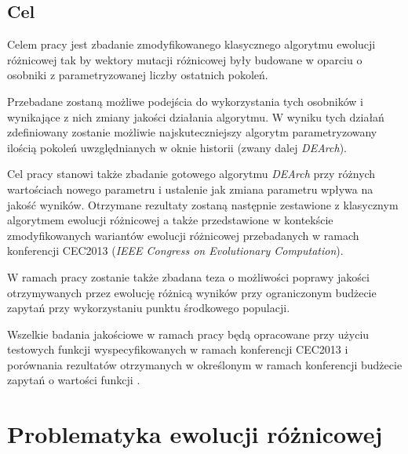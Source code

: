 \documentclass[12pt,a4paper]{report}
\begin{document}
{\section{Cel}
\par{
Celem pracy jest zbadanie zmodyfikowanego klasycznego algorytmu ewolucji różnicowej tak by wektory mutacji różnicowej były budowane w oparciu o osobniki z parametryzowanej liczby ostatnich pokoleń.
}
\par{
Przebadane zostaną możliwe podejścia do wykorzystania tych osobników i wynikające z nich zmiany jakości działania algorytmu. W wyniku tych działań zdefiniowany zostanie możliwie najskuteczniejszy algorytm parametryzowany ilością pokoleń uwzględnianych w oknie historii (zwany dalej \emph{DEArch}).
}
\par{
Cel pracy stanowi także zbadanie gotowego algorytmu \emph{DEArch} przy różnych wartościach nowego parametru i ustalenie jak zmiana parametru wpływa na jakość wyników. Otrzymane rezultaty zostaną następnie zestawione z klasycznym algorytmem ewolucji różnicowej a także przedstawione w kontekście zmodyfikowanych wariantów ewolucji różnicowej przebadanych w ramach konferencji CEC2013 (\emph{IEEE Congress on Evolutionary Computation}).
}
\par{
W ramach pracy zostanie także zbadana teza o możliwości poprawy jakości otrzymywanych przez ewolucję różnicą wyników przy ograniczonym budżecie zapytań przy wykorzystaniu punktu środkowego populacji.
}
\par{
Wszelkie badania jakościowe w ramach pracy będą opracowane przy użyciu testowych funkcji wyspecyfikowanych w ramach konferencji CEC2013 i porównania rezultatów otrzymanych w określonym w ramach konferencji budżecie zapytań o wartości funkcji \cite{Li13benchmarkfunctions}.
}




\chapter{Problematyka ewolucji różnicowej}
}
\end{document}

